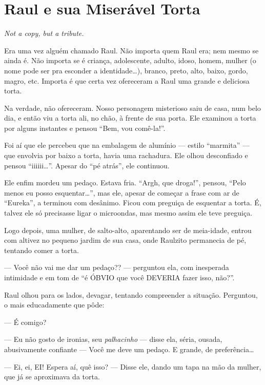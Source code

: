 \chapter{Raul e sua Miserável Torta}

\begin{flushright}
\foreignlanguage{english}{\emph{Not a copy, but a tribute.}}
\end{flushright}

Era uma vez alguém chamado Raul. Não importa quem Raul era; nem mesmo se ainda é. Não importa se é criança, adolescente, adulto, idoso, homem, mulher (o nome pode ser pra esconder a identidade\ldots), branco, preto, alto, baixo, gordo, magro, etc. Importa é que certa vez ofereceram a Raul uma grande e deliciosa torta.

Na verdade, não ofereceram. Nosso personagem misterioso saiu de casa, num belo dia, e então viu a torta ali, no chão, à frente de sua porta. Ele examinou a torta por alguns instantes e pensou ``Bem, vou comê-la!''.

Foi aí que ele percebeu que na embalagem de alumínio --- estilo ``marmita'' --- que envolvia por baixo a torta, havia uma rachadura. Ele olhou desconfiado e pensou ``iiiiii\ldots''. Apesar do ``pé atrás'', ele continuou.

Ele enfim mordeu um pedaço. Estava fria. ``Argh, que droga!'', pensou, ``Pelo menos eu posso esquentar\ldots'', mas ele, apesar de começar a frase com ar de ``Eureka'', a terminou com desânimo. Ficou com preguiça de esquentar a torta. É, talvez ele só precisasse ligar o microondas, mas mesmo assim ele teve preguiça.

Logo depois, uma mulher, de salto-alto, aparentando ser de meia-idade, entrou com altivez no pequeno jardim de sua casa, onde Raulzito permanecia de pé, tentando comer a torta.

--- Você não vai me dar um pedaço?? --- perguntou ela, com inesperada intimidade e em tom de ``é ÓBVIO que você DEVERIA fazer isso, não?''.

Raul olhou para os lados, devagar, tentando compreender a situação. Perguntou, o mais educadamente que pôde:

--- É comigo?

--- Eu não gosto de ironias, seu \emph{palhacinho} --- disse ela, séria, ousada, abusivamente confiante --- Você me deve um pedaço. E grande, de preferência\ldots

--- Ei, ei, EI! Espera aí, quê isso? --- Disse ele, dando um tapa na mão da mulher, que já se aproximava da torta.

